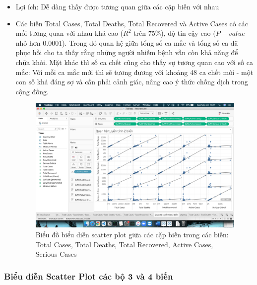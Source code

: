 \documentclass[a4paper, 12pt]{article}
\begin{document}
\begin{itemize}
    \item Lợi ích: Dễ dàng thấy được tương quan giữa các cặp biến với nhau
    \item Các biến Total Cases, Total Deaths, Total Recovered và Active Cases có các mối tương quan với nhau khá cao ($R^2$ trên 75\%), độ tin cậy cao ($P-value$ nhỏ hơn 0.0001). Trong đó quan hệ giữa tổng số ca mắc và tổng số ca đã phục hồi cho ta thấy rằng những người nhiễm bệnh vẫn còn khả năng để chữa khỏi. Mặt khác thì số ca chết cũng cho thấy sự tương quan cao với số ca mắc: Với mỗi ca mắc mới thì sẽ tương đương với khoảng 48 ca chết mới - một con số khá đáng sợ và cần phải cảnh giác, nâng cao ý thức chống dịch trong cộng đồng.
    \begin{figure}[H]
        \begin{center}
            \includegraphics[scale=0.4]{img/corelation.png}
            \caption{Biểu đồ biểu diễn scatter plot giữa các cặp biến trong các biến: Total Cases, Total Deaths, Total Recovered, Active Cases, Serious Cases}
        \end{center}
    \end{figure}
\end{itemize}

\subsubsection{Biểu diễn Scatter Plot các bộ 3 và 4 biến}
\end{document}
